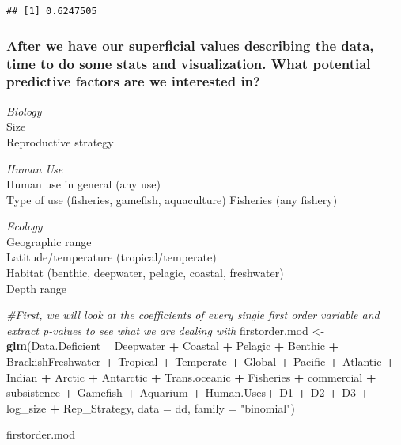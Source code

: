 \documentclass[]{article}
\newenvironment{Shaded}{\begin{snugshade}}{\end{snugshade}}
\newcommand{\KeywordTok}[1]{\textcolor[rgb]{0.13,0.29,0.53}{\textbf{#1}}}
\newcommand{\DataTypeTok}[1]{\textcolor[rgb]{0.13,0.29,0.53}{#1}}
\newcommand{\StringTok}[1]{\textcolor[rgb]{0.31,0.60,0.02}{#1}}
\newcommand{\CommentTok}[1]{\textcolor[rgb]{0.56,0.35,0.01}{\textit{#1}}}
\newcommand{\OperatorTok}[1]{\textcolor[rgb]{0.81,0.36,0.00}{\textbf{#1}}}
\newcommand{\NormalTok}[1]{#1}
\begin{document}
\begin{verbatim}
## [1] 0.6247505
\end{verbatim}

\subsubsection{After we have our superficial values describing the data,
time to do some stats and visualization. What potential predictive
factors are we interested
in?}\label{after-we-have-our-superficial-values-describing-the-data-time-to-do-some-stats-and-visualization.-what-potential-predictive-factors-are-we-interested-in}

\emph{Biology}\\
Size\\
Reproductive strategy

\emph{Human Use}\\
Human use in general (any use)\\
Type of use (fisheries, gamefish, aquaculture) Fisheries (any fishery)

\emph{Ecology}\\
Geographic range\\
Latitude/temperature (tropical/temperate)\\
Habitat (benthic, deepwater, pelagic, coastal, freshwater)\\
Depth range

\begin{Shaded}
\begin{Highlighting}[]
\CommentTok{#First, we will look at the coefficients of every single first order variable and extract p-values to see what we are dealing with}
\NormalTok{firstorder.mod <-}\StringTok{ }\KeywordTok{glm}\NormalTok{(Data.Deficient }\OperatorTok{~}\StringTok{ }\NormalTok{Deepwater }\OperatorTok{+}\StringTok{ }\NormalTok{Coastal }\OperatorTok{+}\StringTok{ }\NormalTok{Pelagic }\OperatorTok{+}\StringTok{ }\NormalTok{Benthic }\OperatorTok{+}\StringTok{ }\NormalTok{BrackishFreshwater }\OperatorTok{+}
\StringTok{      }\NormalTok{Tropical }\OperatorTok{+}\StringTok{ }\NormalTok{Temperate }\OperatorTok{+}\StringTok{ }
\StringTok{      }\NormalTok{Global }\OperatorTok{+}\StringTok{ }\NormalTok{Pacific }\OperatorTok{+}\StringTok{ }\NormalTok{Atlantic }\OperatorTok{+}\StringTok{ }\NormalTok{Indian }\OperatorTok{+}\StringTok{ }\NormalTok{Arctic }\OperatorTok{+}\StringTok{ }\NormalTok{Antarctic }\OperatorTok{+}\StringTok{ }\NormalTok{Trans.oceanic }\OperatorTok{+}
\StringTok{      }\NormalTok{Fisheries }\OperatorTok{+}\StringTok{ }\NormalTok{commercial }\OperatorTok{+}\StringTok{ }\NormalTok{subsistence }\OperatorTok{+}\StringTok{ }\NormalTok{Gamefish }\OperatorTok{+}\StringTok{ }\NormalTok{Aquarium }\OperatorTok{+}\StringTok{ }\NormalTok{Human.Uses}\OperatorTok{+}\StringTok{ }\NormalTok{D1 }\OperatorTok{+}\StringTok{ }\NormalTok{D2 }\OperatorTok{+}\StringTok{ }\NormalTok{D3 }\OperatorTok{+}
\StringTok{      }\NormalTok{log_size }\OperatorTok{+}\StringTok{ }\NormalTok{Rep_Strategy, }\DataTypeTok{data =}\NormalTok{ dd, }\DataTypeTok{family =} \StringTok{"binomial"}\NormalTok{)}

\NormalTok{firstorder.mod }
\end{Highlighting}
\end{Shaded}
\end{document}
